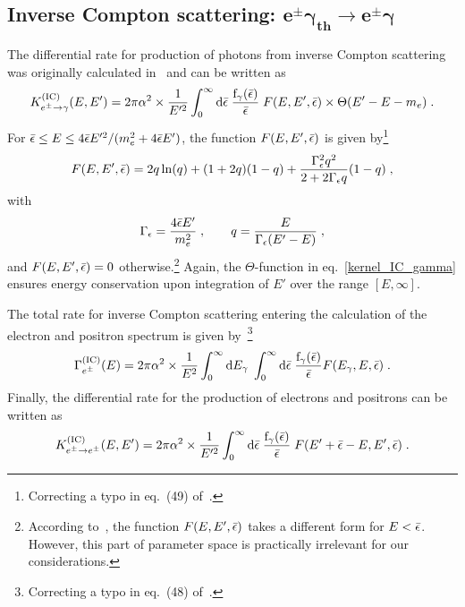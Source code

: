 \documentclass[11pt,a4paper]{article}
\newcommand{\fpdi}{\mathrm{f}}
\newcommand{\eqsp}{\;}
\begin{document}
\subsection*{Inverse Compton scattering: $\boldsymbol{e^\pm \gamma_\text{th} \rightarrow e^\pm \gamma}$}
The differential rate for production of photons from inverse Compton scattering was originally calculated in~\cite{Jones:1968zza} and can be written as
\begin{align}
K_{e^\pm \rightarrow \gamma}^\text{(IC)}(E, E') = 2\pi\alpha^2\times \frac{1}{E'^2} \int_{0}^{\infty} \text{d}\be\;\frac{\fpdi_\gamma(\be)}{\be}\;F(E, E', \be) \times \Theta(E' - E - m_e)\eqsp.
\label{kernel_IC_gamma}
\end{align}
For $\bar{\epsilon} \leq E \leq 4\bar{\epsilon} E'^2/(m_e^2 + 4\bar{\epsilon} E')$, the function $F(E, E', \bar{\epsilon})$ is given by\footnote{Correcting a typo in eq.~(49) of~\cite{Kawasaki:1994sc}.}
\begin{align}
F(E, E', \be) = 2q\ln(q) + (1+2q)(1-q)+\frac{\Gamma_\epsilon^2 q^2}{2+2\Gamma_\epsilon q}(1-q) \eqsp,
\end{align}
with
\begin{align}
\Gamma_\epsilon = \frac{4\be E'}{m_e^2}\eqsp, \qquad q = \frac{E}{\Gamma_\epsilon(E' - E)}\eqsp,
\end{align}
and $F(E, E', \bar{\epsilon}) = 0$ otherwise.\footnote{According to~\cite{Jones:1968zza}, the function $F(E, E', \bar{\epsilon})$ takes a different form for $E < \bar{\epsilon}$. However, this part of parameter space is practically irrelevant for our considerations.} Again, the $\Theta$-function in eq.~\eqref{kernel_IC_gamma} ensures energy conservation upon integration of $E'$ over the range $[E, \infty]$.

The total rate for inverse Compton scattering entering the calculation of the electron and positron spectrum is given by~\cite{Jones:1968zza, Kawasaki:1994sc}\footnote{Correcting a typo in eq.~(48) of~\cite{Kawasaki:1994sc}.}
\begin{align}
\Gamma_{e^\pm}^\text{(IC)}(E) = 2\pi \alpha^2 \times \frac{1}{E^2}\int_{0}^{\infty} \text{d}E_\gamma\; \int_{0}^{\infty} \text{d}\be\; \frac{\fpdi_\gamma(\be)}{\be} F(E_\gamma, E, \be) \eqsp.
\end{align}
Finally, the differential rate for the production of electrons and positrons can be written as~\cite{Jones:1968zza, Kawasaki:1994sc}
\begin{align}
K_{e^\pm \rightarrow e^\pm}^\text{(IC)}(E, E') = 2\pi\alpha^2\times \frac{1}{E'^2} \int_{0}^{\infty} \text{d}\be\;\frac{\fpdi_\gamma(\be)}{\be}\;F(E'+\be - E, E', \be) \eqsp.
\end{align}
\end{document}
